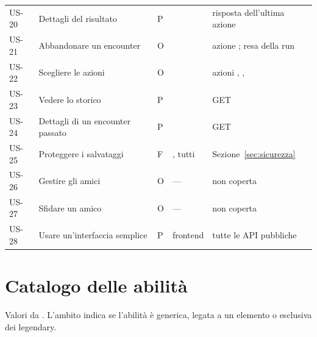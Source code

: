 \documentclass[11pt,a4paper]{article}
\begin{document}
\begin{xltabular}{\linewidth}{@{}L{1.3cm}L{4.2cm}L{0.6cm}L{2.1cm}Y@{}}
  US-20 & Dettagli del risultato & P &  & risposta dell'ultima azione \\
  US-21 & Abbandonare un encounter & O &  & azione ; resa della run \\
  US-22 & Scegliere le azioni & O &  & azioni , ,  \\
  US-23 & Vedere lo storico & P &  & GET  \\
  US-24 & Dettagli di un encounter passato & P &  & GET  \\
  US-25 & Proteggere i salvataggi & F & , tutti & Sezione~\ref{sec:sicurezza} \\
  US-26 & Gestire gli amici & O & — & non coperta \\
  US-27 & Sfidare un amico & O & — & non coperta \\
  US-28 & Usare un'interfaccia semplice & P & frontend & tutte le API pubbliche \\
  \bottomrule
\end{xltabular}

\section{Catalogo delle abilità}\label{app:abilita}

Valori da . L'ambito indica se l'abilità è generica, legata a un elemento o esclusiva dei legendary.
\end{document}
